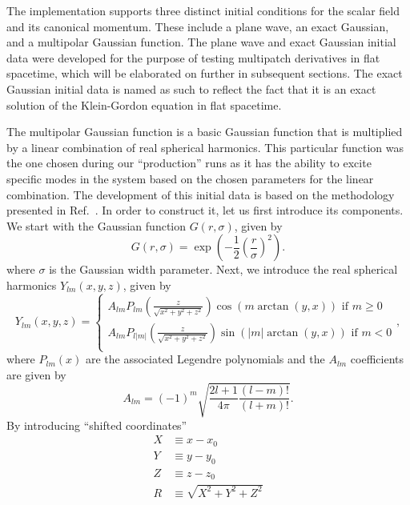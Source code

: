 The implementation supports three distinct initial conditions for the scalar field and its canonical momentum. These include a plane wave, an exact Gaussian, and a multipolar Gaussian function. The plane wave and exact Gaussian initial data were developed for the purpose of testing multipatch derivatives in flat spacetime, which will be elaborated on further in subsequent sections. The exact Gaussian initial data is named as such to reflect the fact that it is an exact solution of the Klein-Gordon equation in flat spacetime.

The multipolar Gaussian function is a basic Gaussian function that is multiplied by a linear combination of real spherical harmonics. This particular function was the one chosen during our ``production'' runs as it has the ability to excite specific modes in the system based on the chosen parameters for the linear combination. The development of this initial data is based on the methodology presented in Ref.~\cite{PhysRevD.87.043513}. In order to construct it, let us first introduce its components. We start with the Gaussian function $G(r, \sigma)$, given by
%
\begin{equation}
  G(r, \sigma) = \exp\left( -\frac{1}{2} \left( \frac{r}{\sigma} \right)^2  \right).
  \label{eq:wave_scattering_gaussian}
\end{equation}
%
where $\sigma$ is the Gaussian width parameter. Next, we introduce the real spherical harmonics $Y_{lm}(x,y,z)$, given by
%
\begin{equation}
  Y_{lm}(x, y, z) =
  \begin{cases}
    A_{lm} P_{lm}\left( \frac{z}{\sqrt{x^2 + y^2 + z^2}} \right) \cos(m \arctan(y,x)) \text{ if } m \geq 0  \\
    A_{lm} P_{l|m|}\left( \frac{z}{\sqrt{x^2 + y^2 + z^2}} \right) \sin(|m| \arctan(y,x)) \text{ if } m < 0 \\
  \end{cases}
  ,
  \label{eq:wave_scattering_real_spherical_harmonics}
\end{equation}
%
where $P_{lm}(x)$ are the associated Legendre polynomials and the $A_{lm}$ coefficients are given by
%
\begin{equation}
  A_{lm} = (-1)^m \sqrt{\frac{2 l + 1}{4\pi} \frac{(l-m)!}{(l+m)!}}.
  \label{eq:wave_scattering_real_spherical_harmonics_coeffs}
\end{equation}
%
By introducing ``shifted coordinates''
%
\begin{align}
  X & \equiv x - x_0 \label{eq:wave_scattering_real_spherical_harmonics_shifted_x}                \\
  Y & \equiv y - y_0 \label{eq:wave_scattering_real_spherical_harmonics_shifted_y}                \\
  Z & \equiv z - z_0 \label{eq:wave_scattering_real_spherical_harmonics_shifted_z}                \\
  R & \equiv \sqrt{X^2 + Y^2 + Z^2} \label{eq:wave_scattering_real_spherical_harmonics_shifted_r} \\
\end{align}
